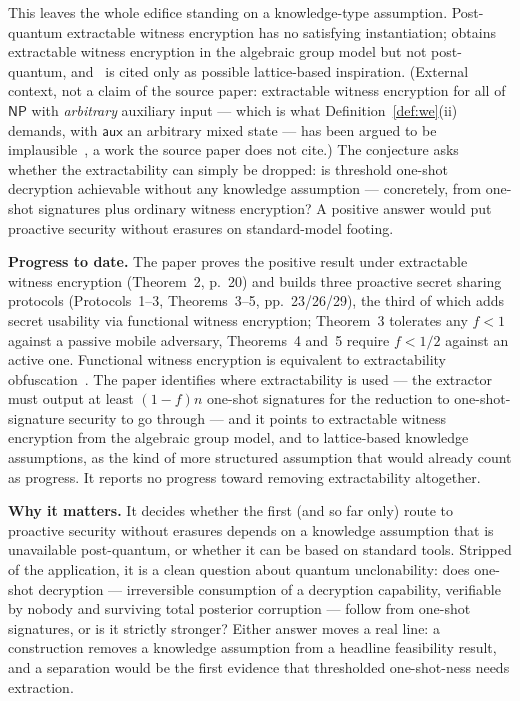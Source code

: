 \documentclass{aicr-conjecture}
\newcommand{\NP}{\mathsf{NP}}
\newcommand{\aux}{\mathsf{aux}}
\begin{document}
This leaves the whole edifice standing on a knowledge-type assumption.
Post-quantum extractable witness encryption has no satisfying
instantiation; \cite{FHAS24} obtains extractable witness encryption in
the algebraic group model but not post-quantum, and~\cite{ACL+22} is
cited only as possible lattice-based inspiration. (External context,
not a claim of the source paper: extractable witness encryption for
all of $\NP$ with \emph{arbitrary} auxiliary input --- which is what
Definition~\ref{def:we}(ii) demands, with $\aux$ an arbitrary mixed
state --- has been argued to be implausible~\cite{GGHW14}, a work the
source paper does not cite.) The conjecture asks whether the
extractability can simply be dropped: is threshold one-shot decryption
achievable without any knowledge assumption --- concretely, from
one-shot signatures plus ordinary witness encryption? A positive
answer would put proactive security without erasures on standard-model
footing.

\textbf{Progress to date.} The paper proves the positive result under
extractable witness encryption (Theorem~2, p.~20) and builds three
proactive secret sharing protocols (Protocols~1--3, Theorems~3--5,
pp.~23/26/29), the third of which adds secret usability via functional
witness encryption; Theorem~3 tolerates any $f < 1$ against a passive
mobile adversary, Theorems~4 and~5 require $f < 1/2$ against an active
one. Functional witness encryption is equivalent to extractability
obfuscation~\cite{BCP14}. The paper identifies where extractability is
used --- the extractor must output at least $(1-f)n$ one-shot
signatures for the reduction to one-shot-signature security to go
through --- and it points to extractable witness encryption from the
algebraic group model, and to lattice-based knowledge assumptions, as
the kind of more structured assumption that would already count as
progress. It reports no progress toward removing extractability
altogether.

\textbf{Why it matters.} It decides whether the first (and so far
only) route to proactive security without erasures depends on a
knowledge assumption that is unavailable post-quantum, or whether it
can be based on standard tools. Stripped of the application, it is a
clean question about quantum unclonability: does one-shot decryption
--- irreversible consumption of a decryption capability, verifiable by
nobody and surviving total posterior corruption --- follow from
one-shot signatures, or is it strictly stronger? Either answer moves a
real line: a construction removes a knowledge assumption from a
headline feasibility result, and a separation would be the first
evidence that thresholded one-shot-ness needs extraction.
\end{document}
